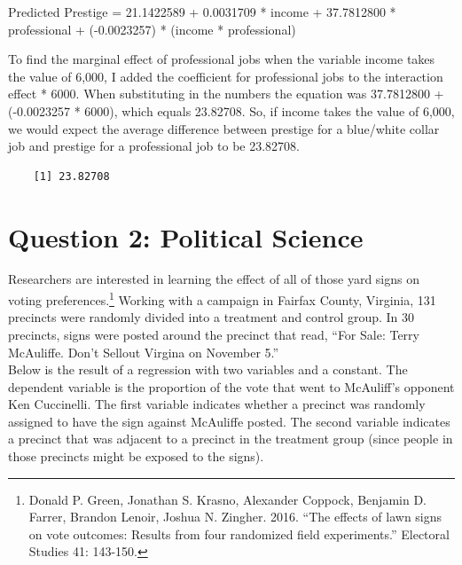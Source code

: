 \documentclass[12pt,letterpaper]{article}
\begin{document}
\begin{enumerate}
	\vspace{.1cm}
	
	\noindent Predicted Prestige = 21.1422589 + 0.0031709 * income + 37.7812800  * professional + (-0.0023257) * (income * professional)
	
	\noindent To find the marginal effect of professional jobs when the variable income takes the value of 6,000, I added the coefficient for professional jobs to the interaction effect * 6000. When substituting in the numbers the equation was 37.7812800 + (-0.0023257 * 6000), which equals 23.82708. So, if income takes the value of 6,000, we would expect the average difference between prestige for a blue/white collar job and prestige for a professional job to be 23.82708.
	
	
	
	\begin{verbatim}
	[1] 23.82708
	\end{verbatim} 
	

	


	
	
	
\end{enumerate}

\vspace{1cm}

\section*{Question 2: Political Science}
\vspace{.25cm}
\noindent 	Researchers are interested in learning the effect of all of those yard signs on voting preferences.\footnote{Donald P. Green, Jonathan	S. Krasno, Alexander Coppock, Benjamin D. Farrer,	Brandon Lenoir, Joshua N. Zingher. 2016. ``The effects of lawn signs on vote outcomes: Results from four randomized field experiments.'' Electoral Studies 41: 143-150. } Working with a campaign in Fairfax County, Virginia, 131 precincts were randomly divided into a treatment and control group. In 30 precincts, signs were posted around the precinct that read, ``For Sale: Terry McAuliffe. Don't Sellout Virgina on November 5.'' \\

Below is the result of a regression with two variables and a constant.  The dependent variable is the proportion of the vote that went to McAuliff's opponent Ken Cuccinelli. The first variable indicates whether a precinct was randomly assigned to have the sign against McAuliffe posted. The second variable indicates
a precinct that was adjacent to a precinct in the treatment group (since people in those precincts might be exposed to the signs).  \\
\end{document}
